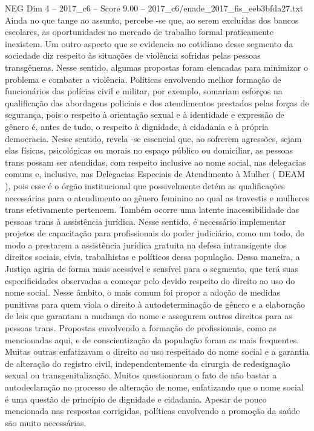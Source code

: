 \begin{textsample}{NEG Dim 4 – 2017\_c6 – Score 9.00 – 2017\_c6/enade\_2017\_fis\_eeb3bfda27.txt}
Ainda no que tange ao assunto, percebe -se que, ao serem excluídas dos bancos escolares, as oportunidades no mercado de trabalho formal praticamente inexistem.
Um outro aspecto que se evidencia no cotidiano desse segmento da sociedade diz respeito às situações de violência sofridas pelas pessoas transgêneras.
Nesse sentido, algumas propostas foram elencadas para minimizar o problema e combater a violência.
Políticas envolvendo melhor formação de funcionários das polícias civil e militar, por exemplo, somariam esforços na qualificação das abordagens policiais e dos atendimentos prestados pelas forças de segurança, pois o respeito à orientação sexual e à identidade e expressão de gênero é, antes de tudo, o respeito à dignidade, à cidadania e à própria democracia.
Nesse sentido, revela -se essencial que, ao sofrerem agressões, sejam elas físicas, psicológicas ou morais no espaço público ou domiciliar, as pessoas trans possam ser atendidas, com respeito inclusive ao nome social, nas delegacias comuns e, inclusive, nas Delegacias Especiais de Atendimento à Mulher ( DEAM ), pois esse é o órgão institucional que possivelmente detém as qualificações necessárias para o atendimento ao gênero feminino ao qual as travestis e mulheres trans efetivamente pertencem.
Também ocorre uma latente inacessibilidade das pessoas trans à assistência jurídica.
Nesse sentido, é necessário implementar projetos de capacitação para profissionais do poder judiciário, como um todo, de modo a prestarem a assistência jurídica gratuita na defesa intransigente dos direitos sociais, civis, trabalhistas e políticos dessa população.
Dessa maneira, a Justiça agiria de forma mais acessível e sensível para o segmento, que terá suas especificidades observadas a começar pelo devido respeito do direito ao uso do nome social.
Nesse âmbito, o mais comum foi propor a adoção de medidas punitivas para quem viola o direito à autodeterminação de gênero e a elaboração de leis que garantam a mudança do nome e assegurem outros direitos para as pessoas trans.
Propostas envolvendo a formação de profissionais, como as mencionadas aqui, e de conscientização da população foram as mais frequentes.
Muitas outras enfatizavam o direito ao uso respeitado do nome social e a garantia de alteração do registro civil, independentemente da cirurgia de redesignação sexual ou transgenitalização.
Muitos questionaram o fato de não bastar a autodeclaração no processo de alteração de nome, enfatizando que o nome social é uma questão de princípio de dignidade e cidadania.
Apesar de pouco mencionada nas respostas corrigidas, políticas envolvendo a promoção da saúde são muito necessárias.

\end{textsample}
